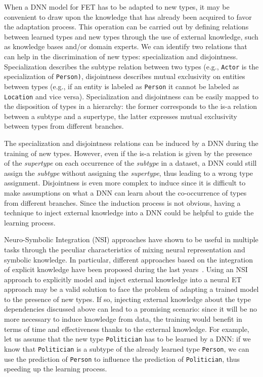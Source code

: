 When a DNN model for FET has to be adapted to new types, it may be convenient to draw upon the knowledge that has already been acquired to favor the adaptation process. This operation can be carried out by defining relations between learned types and new types through the use of external knowledge, such as knowledge bases and/or domain experts. 
We can identify two relations that can help in the discrimination of new types: specialization and disjointness. Specialization describes the subtype relation between two types (e.g., \texttt{Actor} is the specialization of \texttt{Person)}, disjointness describes mutual exclusivity on entities between types (e.g., if an entity is labeled as \texttt{Person} it cannot be labeled as \texttt{Location} and vice versa). Specialization and disjointness can be easily mapped to the disposition of types in a hierarchy: the former corresponds to the is-a relation between a subtype and a supertype, the latter expresses mutual exclusivity between types from different branches.

The specialization and disjointness relations can be induced by a DNN during the training of new types. However, even if the is-a relation is given by the presence of the \textit{supertype} on each occurrence of the \textit{subtype} in a dataset, a DNN could still assign the \textit{subtype} without assigning the \textit{supertype}, thus leading to a wrong type assignment. Disjointness is even more complex to induce since it is difficult to make assumptions on what a DNN can learn about the co-occurrence of types from different branches. Since the induction process is not obvious, having a technique to inject external knowledge into a DNN could be helpful to guide the learning process.

Neuro-Symbolic Integration (NSI) approaches have shown to be useful in multiple tasks through the peculiar characteristics of mixing neural representation and symbolic knowledge. In particular, different approaches based on the integration of explicit knowledge have been proposed during the last years~\cite{sarker2021neuro}. 
Using an NSI approach to explicitly model and inject external knowledge into a neural ET approach may be a valid solution to face the problem of adapting a trained model to the presence of new types. If so, injecting external knowledge about the type dependencies discussed above can lead to a promising scenario: since it will be no more necessary to induce knowledge from data, the training would benefit in terms of time and effectiveness thanks to the external knowledge. For example, let us assume that the new type \texttt{Politician} has to be learned by a DNN: if we know that \texttt{Politician} is a subtype of the already learned type \texttt{Person}, we can use the prediction of \texttt{Person} to influence the prediction of \texttt{Politician}, thus speeding up the learning process.

